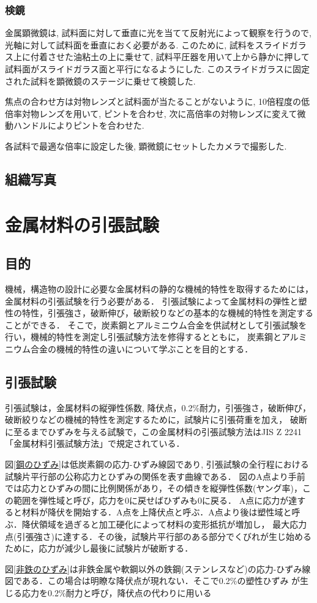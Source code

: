 \documentclass[a4paper,11pt,uplatex]{jsarticle}
\begin{document}
\subsubsection{検鏡}
金属顕微鏡は, 試料面に対して垂直に光を当てて反射光によって観察を行うので, 光軸に対して試料面を垂直におく必要がある.
このために, 試料をスライドガラス上に付着させた油粘土の上に乗せて, 試料平圧器を用いて上から静かに押して試料面がスライドガラス面と平行になるようにした.
このスライドガラスに固定された試料を顕微鏡のステージに乗せて検鏡した.
\par
焦点の合わせ方は対物レンズと試料面が当たることがないように, 10倍程度の低倍率対物レンズを用いて, ピントを合わせ,
次に高倍率の対物レンズに変えて微動ハンドルによりピントを合わせた.
\par
各試料で最適な倍率に設定した後, 顕微鏡にセットしたカメラで撮影した.

\subsection{組織写真}


\section{金属材料の引張試験}
\subsection{目的}
機械，構造物の設計に必要な金属材料の静的な機械的特性を取得するためには，金属材料の引張試験を行う必要がある．
引張試験によって金属材料の弾性と塑性の特性，引張強さ，破断伸び，破断絞りなどの基本的な機械的特性を測定することができる．
そこで，炭素鋼とアルミニウム合金を供試材として引張試験を行い，機械的特性を測定し引張試験方法を修得するとともに，
炭素鋼とアルミニウム合金の機械的特性の違いについて学ぶことを目的とする．
\subsection{引張試験}
引張試験は，金属材料の縦弾性係数, 降伏点，0.2\%耐力，引張強さ，破断伸び，破断絞りなどの機械的特性を測定するために，試験片に引張荷重を加え，
破断に至るまでひずみを与える試験で，この金属材料の引張試験方法はJIS Z 2241「金属材料引張試験方法」で規定されている．　
\par
図\ref{鋼のひずみ}は低炭素鋼の応力-ひずみ線図であり, 引張試験の全行程における試験片平行部の公称応力とひずみの関係を表す曲線である．
図のA点より手前では応力とひずみの間に比例関係があり，その傾きを縦弾性係数(ヤング率)，この範囲を弾性域と呼び，応力を0に戻せばひずみも0に戻る．
A点に応力が達すると材料が降伏を開始する．A点を上降伏点と呼ぶ．A点より後は塑性域と呼ぶ．降伏領域を過ぎると加工硬化によって材料の変形抵抗が増加し，
最大応力点(引張強さ)に達する．その後，試験片平行部のある部分でくびれが生じ始めるために，応力が減少し最後に試験片が破断する．　
\par
図\ref{非鉄のひずみ}は非鉄金属や軟鋼以外の鉄鋼(ステンレスなど)の応力-ひずみ線図である．この場合は明瞭な降伏点が現れない．そこで0.2\%の塑性ひずみ
が生じる応力を0.2\%耐力と呼び，降伏点の代わりに用いる
\end{document}
